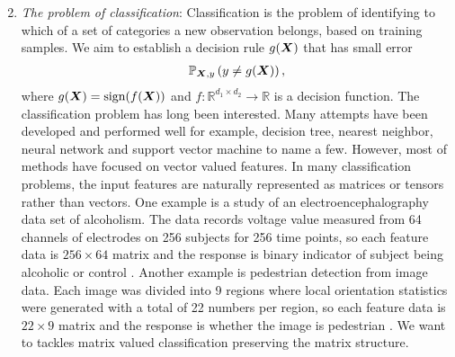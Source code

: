 \documentclass[12pt]{article}
\begin{document}
\begin{enumerate}[label={2.\arabic*}]
\setcounter{enumi}{1}
\item {\it The problem of classification}: Classification is the problem of identifying to which of a set of categories a new observation belongs, based on training samples. We aim to establish a decision rule $g(\bm X)$ that has small error
\begin{align}
    \mathbb{P}_{\bm X,y}\left(y\neq g(\bm X)\right),
\end{align}
where $g(\bm X) = \text{sign}(f(\bm X))$ and $f:\mathbb{R}^{d_1\times d_2}\rightarrow \mathbb{R}$ is a decision function. The classification problem has long been interested. Many attempts have been developed and performed well for example, decision tree, nearest neighbor, neural network and support vector machine to name a few. However, most of methods have focused on vector valued features. In many classification problems, the input features are naturally represented as matrices or tensors rather than vectors. One example is a study of an electroencephalography data set of alcoholism. The data records voltage value measured from 64 channels of electrodes on 256 subjects for 256 time points, so each feature data is $256\times 64$ matrix and the response is binary indicator of subject being alcoholic or control \citep{zhou2014regularized}. Another example is pedestrian detection from image data. Each image was divided into 9 regions where local orientation statistics were generated with a total of 22 numbers per region, so each feature data is $22 \times 9$ matrix and the response is whether the image is pedestrian \citep{Shashua2004PedestrianDF}. We want to tackles matrix valued classification preserving the matrix structure.



\end{enumerate}
\end{document}
